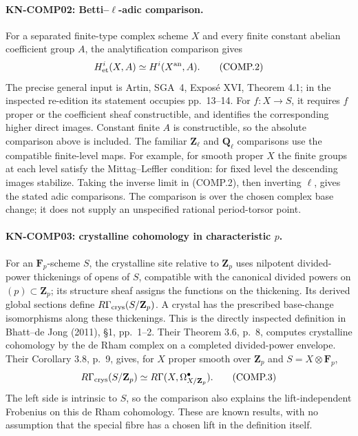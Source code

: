\paragraph{KN-COMP02: Betti--\texorpdfstring{$\ell$}{ell}-adic comparison.}
For a separated finite-type complex scheme $X$ and every finite
constant abelian coefficient group $A$, the analytification comparison gives
\[
 H^i_{\rm et}(X,A)\simeq H^i(X^{\rm an},A).
 \tag{COMP.2}
\]
The precise general input is Artin, SGA~4, Expos\'e XVI,
Theorem 4.1; in the inspected re-edition its statement occupies
pp.~13--14.  For $f:X\to S$, it requires $f$ proper or the
coefficient sheaf constructible, and identifies the corresponding
higher direct images.  Constant finite $A$ is constructible, so the
absolute comparison above is included.  The familiar $\mathbf Z_\ell$
and $\mathbf Q_\ell$ comparisons use the compatible finite-level maps.
For example, for smooth proper $X$ the finite groups at each level
satisfy the Mittag--Leffler condition: for fixed level the descending
images stabilize.  Taking the inverse limit in (COMP.2), then
inverting $\ell$, gives the stated adic comparisons.  The comparison
is over the chosen complex base change; it does not supply an
unspecified rational period-torsor point.

\paragraph{KN-COMP03: crystalline cohomology in characteristic
\texorpdfstring{$p$}{p}.}
For an $\mathbf F_p$-scheme $S$, the crystalline site relative to
$\mathbf Z_p$ uses nilpotent divided-power thickenings of opens of
$S$, compatible with the canonical divided powers on $(p)\subset\mathbf Z_p$; its structure sheaf assigns the functions on the thickening.
Its derived global sections define $R\Gamma_{\rm crys}(S/\mathbf Z_p)$.
A crystal has the prescribed base-change isomorphisms along these
thickenings.  This is the directly inspected definition in
Bhatt--de Jong (2011), \S1, pp.~1--2.
Their Theorem 3.6, p.~8, computes crystalline cohomology by the
de Rham complex on a completed divided-power envelope.  Their
Corollary 3.8, p.~9, gives, for $X$ proper smooth over $\mathbf Z_p$
and $S=X\otimes\mathbf F_p$,
\[
 R\Gamma_{\rm crys}(S/\mathbf Z_p)
        \simeq R\Gamma(X,\Omega^\bullet_{X/\mathbf Z_p}).
 \tag{COMP.3}
\]
The left side is intrinsic to $S$, so the comparison also explains
the lift-independent Frobenius on this de Rham cohomology.
These are known results, with no assumption that the special fibre
has a chosen lift in the definition itself.

